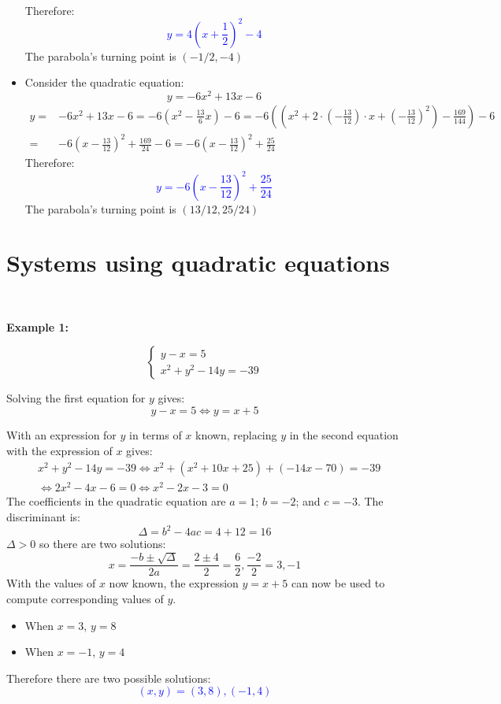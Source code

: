 \documentclass{article}
\newcommand{\dg}[1]{\textcolor{dark_green}{#1}}
\newcommand{\blue}[1]{\textcolor{blue}{#1}}
\begin{document}
\begin{itemize}
\begin{align*}
\end{align*}
Therefore:
\blue{\[y = 4(x + \frac{1}{2})^2 - 4\]}
The parabola's turning point is \((-1/2, -4)\)
\item Consider the quadratic equation:
\dg{\[y = -6x^2 + 13x - 6\]}
\begin{align*}
y = & -6x^2 + 13x - 6 
= -6(x^2 - \frac{13}{6}x) - 6 
= -6((x^2 + 2 \cdot (-\frac{13}{12}) \cdot x + (-\frac{13}{12})^2) - \frac{169}{144}) - 6 \\
= & -6(x - \frac{13}{12})^2 + \frac{169}{24} - 6 
= -6(x - \frac{13}{12})^2 + \frac{25}{24}
\end{align*}
Therefore:
\blue{\[y = -6(x - \frac{13}{12})^2 + \frac{25}{24}\]}
The parabola's turning point is \((13/12, 25/24)\)
\end{itemize}




\section*{Systems using quadratic equations}

~

\textbf{Example 1:}

\dg{\[\left\{\begin{array}{c}
y - x = 5 \\
x^2 + y^2 - 14y = -39
\end{array}\right.\]}

Solving the first equation for \(y\) gives:
\[y - x = 5 \iff y = x + 5\] 

With an expression for \(y\) in terms of \(x\) known, replacing \(y\) in the second equation with the expression of \(x\) gives:
\begin{align*}
& x^2 + y^2 - 14y = -39
\iff x^2 + (x^2 + 10x + 25) + (-14x - 70) = -39 \\
& \iff 2x^2 - 4x - 6 = 0 
\iff x^2 - 2x - 3 = 0 
\end{align*}
The coefficients in the quadratic equation are \(a = 1\); \(b = -2\); and \(c = -3\). The discriminant is:
\[\Delta = b^2 - 4ac = 4 + 12 = 16\]
\(\Delta > 0\) so there are two solutions:
\[x = \frac{-b \pm \sqrt{\Delta}}{2a} = \frac{2 \pm 4}{2} = \frac{6}{2}, \frac{-2}{2} = 3, -1\]
With the values of \(x\) now known, the expression \(y = x + 5\) can now be used to compute corresponding values of \(y\).
\begin{itemize}
\item When \(x = 3\), \(y = 8\)
\item When \(x = -1\), \(y = 4\)
\end{itemize}
Therefore there are two possible solutions:
\blue{\[(x,y) = (3,8), (-1,4)\]}
\end{document}
